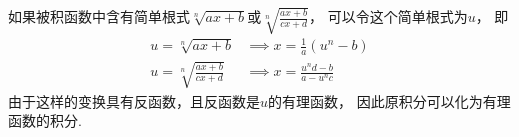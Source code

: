 
如果被积函数中含有简单根式\(\sqrt[n]{ax+b}\)或\(\sqrt[n]{\frac{ax+b}{cx+d}}\)，
可以令这个简单根式为\(u\)，
即\begin{align*}
	u=\sqrt[n]{ax+b} &\implies x=\frac{1}{a}(u^n-b) \\
	u=\sqrt[n]{\frac{ax+b}{cx+d}} &\implies x=\frac{u^nd-b}{a-u^nc}
\end{align*}
由于这样的变换具有反函数，且反函数是\(u\)的有理函数，
因此原积分可以化为有理函数的积分.
